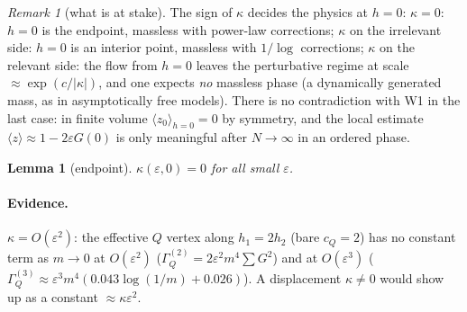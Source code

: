 \documentclass[11pt]{article}
\newtheorem{lemma}[theorem]{Lemma}
\theoremstyle{definition}
\theoremstyle{remark}
\newtheorem{remark}[theorem]{Remark}
\newcommand{\avg}[1]{\langle #1\rangle}
\newcommand{\eps}{\varepsilon}
\begin{document}
\begin{remark}[what is at stake]
  The sign of $\kappa$ decides the physics at $h=0$:
  $\kappa=0$: $h=0$ is the endpoint, massless with power-law corrections;
  $\kappa$ on the irrelevant side: $h=0$ is an interior point, massless with
  $1/\log$ corrections; $\kappa$ on the relevant side: the flow from $h=0$ leaves the
  perturbative regime at scale $\approx\exp(c/|\kappa|)$, and one expects \emph{no}
  massless phase (a dynamically generated mass, as in asymptotically free models). There is
  no contradiction with W1 in the last case: in finite volume $\avg{z_0}_{h=0}=0$ by
  symmetry, and the local estimate $\avg{z}\approx1-2\eps G(0)$ is only meaningful after
  $N\to\infty$ in an ordered phase.
\end{remark}

\begin{lemma}[endpoint]\label{lem:endpoint}
  $\kappa(\eps,0)=0$ for all small $\eps$.
\end{lemma}

\paragraph{Evidence.} $\kappa=O(\eps^2)$: the effective $Q$ vertex along $h_1=2h_2$ (bare
$c_Q=2$) has no constant term as $m\to0$ at $O(\eps^2)$
($\Gamma_Q^{(2)}=2\eps^2m^4\sum G^2$) and at $O(\eps^3)$
($\Gamma_Q^{(3)}\approx\eps^3m^4(0.043\log(1/m)+0.026)$). A displacement $\kappa\neq0$ would
show up as a constant $\approx\kappa\eps^2$.
\end{document}
